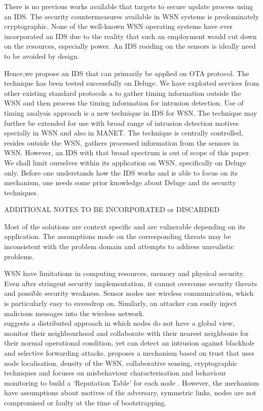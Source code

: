\documentclass[conference,man]{IEEEtran}
\begin{document}
There is no previous works available that targets to secure update process using an IDS.
The security countermeasures available in WSN systems is predominately cryptographic.
None of the well-known WSN operating systems have ever incorporated an IDS due to the reality that such an employment would cut down on the resources, especially power.
An IDS residing on the sensors is ideally need to be avoided by design.

Hence,we propose an IDS that can primarily be applied on OTA protocol.
The technique has been tested successfully on Deluge.
We have exploited services from other existing standard protocols a to gather timing information outside the WSN and then process the timing information for intrusion detection.
Use of timing analysis approach is a new technique in IDS for WSN.
The technique may further be extended for use with broad range of intrusion detection motives specially in WSN and also in MANET.
The technique is centrally controlled, resides outside the WSN, gathers processed information from the sensors in WSN.
However, an IDS with that broad spectrum is out of scope of this paper.
We shall limit ourselves within its application on WSN, specifically on Deluge only.
Before one understands how the IDS works and is able to focus on its  mechanism, one needs some prior knowledge about Deluge and its security techniques.


ADDITIONAL NOTES TO BE INCORPORATED or DISCARDED

Most of the solutions are context specific and are vulnerable depending on its application.
The assumptions made on the corresponding threats may be inconsistent with the problem domain and attempts to address unrealistic problems.

WSN have limitations in computing resources, memory and physical security. 
Even after stringent security implementation, it cannot overcome security threats and possible security weakness. 
Sensor nodes use wireless communication, which is particularly easy to eavesdrop on. Similarly, an attacker can easily inject malicious messages into the wireless network.\\


\cite{ioannis2007towards} suggests a distributed approach in which nodes do not have a global view, monitor their neighbourhood and collaborate with their nearest neighbours for their normal operational condition, yet can detect an intrusion against blackhole and selective forwarding attacks.
\cite{sen2010efficient} proposes a mechanism based on trust that uses node localisation, density of the WSN, collaborative sensing, cryptographic techniques  and focuses on misbehaviour characterisation and behaviour monitoring to build a `Reputation Table' for each node . However, the mechanism have assumptions about motives of the adversary, symmetric links, nodes  are not compromised or faulty at the time of bootstrapping. 
\end{document}
